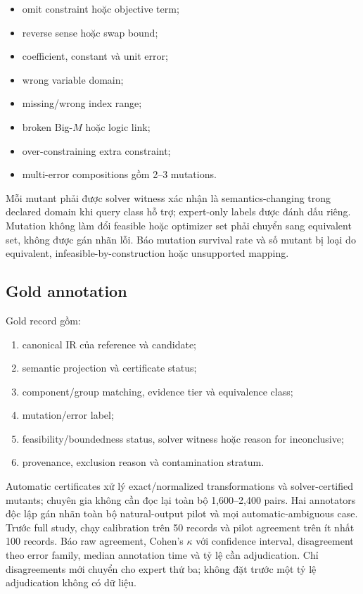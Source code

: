 \documentclass[11pt,a4paper]{article}
\begin{document}
\begin{itemize}
  \item omit constraint hoặc objective term;
  \item reverse sense hoặc swap bound;
  \item coefficient, constant và unit error;
  \item wrong variable domain;
  \item missing/wrong index range;
  \item broken Big-\(M\) hoặc logic link;
  \item over-constraining extra constraint;
  \item multi-error compositions gồm 2--3 mutations.
\end{itemize}

Mỗi mutant phải được solver witness xác nhận là semantics-changing trong
declared domain khi query class hỗ trợ; expert-only labels được đánh dấu riêng.
Mutation không làm đổi feasible hoặc optimizer set phải chuyển sang equivalent
set, không được gán nhãn lỗi. Báo mutation survival rate và số mutant bị loại
do equivalent, infeasible-by-construction hoặc unsupported mapping.

\subsection{Gold annotation}

Gold record gồm:

\begin{enumerate}
  \item canonical IR của reference và candidate;
  \item semantic projection và certificate status;
  \item component/group matching, evidence tier và equivalence class;
  \item mutation/error label;
  \item feasibility/boundedness status, solver witness hoặc reason for
  inconclusive;
  \item provenance, exclusion reason và contamination stratum.
\end{enumerate}

Automatic certificates xử lý exact/normalized transformations và
solver-certified mutants; chuyên gia không cần đọc lại toàn bộ 1,600--2,400
pairs. Hai annotators độc lập gán nhãn toàn bộ natural-output pilot và mọi
automatic-ambiguous case. Trước full study, chạy calibration trên 50 records và
pilot agreement trên ít nhất 100 records. Báo raw agreement, Cohen's
\(\kappa\) với confidence interval, disagreement theo error family, median
annotation time và tỷ lệ cần adjudication. Chỉ disagreements mới chuyển cho
expert thứ ba; không đặt trước một tỷ lệ adjudication không có dữ liệu.
\end{document}
